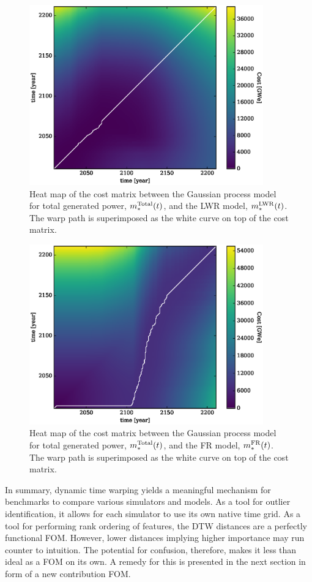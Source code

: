 \begin{figure}[htb]
\centering
\includegraphics[width=0.9\textwidth]{cost-total-model-to-lwr-model.eps}
\caption{Heat map of the cost matrix between the Gaussian process model 
for total generated power, $m_*^{\mathrm{Total}}(t)$, and the LWR model, 
$m_*^{\mathrm{LWR}}(t)$.
The warp path is superimposed as the white curve on top of the cost matrix.}
\label{cost-total-model-to-lwr-model}
\end{figure}

\begin{figure}[htb]
\centering
\includegraphics[width=0.9\textwidth]{cost-total-model-to-fr-model.eps}
\caption{Heat map of the cost matrix between the Gaussian process model 
for total generated power, $m_*^{\mathrm{Total}}(t)$, and the FR model, 
$m_*^{\mathrm{FR}}(t)$.
The warp path is superimposed as the white curve on top of the cost matrix.}
\label{cost-total-model-to-fr-model}
\end{figure}

In summary, dynamic time warping yields a meaningful mechanism for benchmarks to 
compare various simulators and models. As a tool for
outlier identification, it allows for each simulator to use its own native 
time grid. As a tool for performing rank ordering of features, the DTW distances
are a perfectly functional FOM. However, lower distances implying higher 
importance may run counter to intuition. The potential for confusion, therefore,
makes it less than ideal as a FOM on its own. A remedy for this is presented
in the next section in form of a new contribution FOM.
